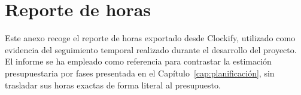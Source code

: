 \chapter{Reporte de horas}\label{anexo:reporte_horas}

Este anexo recoge el reporte de horas exportado desde Clockify, utilizado como evidencia del seguimiento temporal realizado durante el desarrollo del proyecto. El informe se ha empleado como referencia para contrastar la estimación presupuestaria por fases presentada en el Capítulo~\ref{cap:planificación}, sin trasladar sus horas exactas de forma literal al presupuesto.


